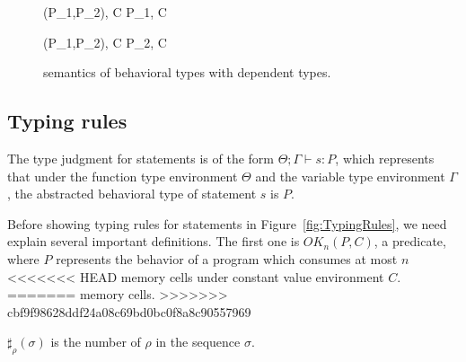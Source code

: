 \begin{figure}
\begin{minipage}{\textwidth}
{ \langle \Sirx (P_1,P_2), C \rangle \xlongrightarrow{\snull} \langle P_1, C\cup{\snull} \rangle }

{ \langle \Sirx (P_1,P_2), C \rangle \xlongrightarrow{\snnull} \langle P_2, C\cup{\snnull} \rangle }

 



\end{minipage}
\caption{semantics of behavioral types with dependent types.}
\label{fig:bdRules}
\end{figure}

\subsection{Typing rules}
The type judgment for statements is of the form \(\Theta; \Gamma
\vdash s : P \), which represents that under the function type
environment \(\Theta\) and the variable type environment \(\Gamma\),
the abstracted behavioral type of statement \(s\) is \(P\).

Before showing typing rules for statements in
Figure~\ref{fig:TypingRules}, we need explain several important
definitions. The first one is \(OK_n(P, C)\), a predicate, where \(P\)
represents the behavior of a program which consumes at most \(n\)
<<<<<<< HEAD
memory cells under constant value environment \(C\).
=======
memory cells.
>>>>>>> cbf9f98628ddf24a08c69bd0bc0f8a8c90557969

\begin{myDef}[\(\sharp_{\rho}(\sigma)\)]
\label{df:sharf}
\(\sharp_{\rho}(\sigma)\) is the number of \(\rho\) in the sequence
\(\sigma\).
\end{myDef}



